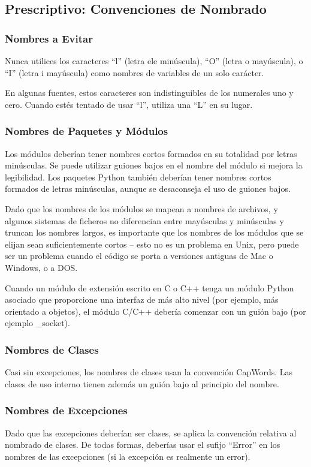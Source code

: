 \documentclass[a4paper,11pt,oneside]{book}
\begin{document}
\subsection{Prescriptivo: Convenciones de Nombrado}
\subsubsection{Nombres a Evitar}
Nunca utilices los caracteres ``l'' (letra ele minúscula), ``O'' (letra o mayúscula), o ``I'' (letra i mayúscula) como nombres de variables de un solo carácter.

En algunas fuentes, estos caracteres son indistinguibles de los numerales uno y cero. Cuando estés tentado de usar ``l'', utiliza una ``L'' en su lugar.
\subsubsection{Nombres de Paquetes y Módulos}
Los módulos deberían tener nombres cortos formados en su totalidad por letras minúsculas. Se puede utilizar guiones bajos en el nombre del módulo si mejora la legibilidad. Los paquetes Python también deberían tener nombres cortos formados de letras minúsculas, aunque se desaconseja el uso de guiones bajos.

Dado que los nombres de los módulos se mapean a nombres de archivos, y algunos sistemas de ficheros no diferencian entre mayúsculas y minúsculas y truncan los nombres largos, es importante que los nombres de los módulos que se elijan sean suficientemente cortos -- esto no es un problema en Unix, pero puede ser un problema cuando el código se porta a versiones antiguas de Mac o Windows, o a DOS.

Cuando un módulo de extensión escrito en C o C++ tenga un módulo Python asociado que proporcione una interfaz de más alto nivel (por ejemplo, más orientado a objetos), el módulo C/C++ debería comenzar con un guión bajo (por ejemplo \_socket).
\subsubsection{Nombres de Clases}
Casi sin excepciones, los nombres de clases usan la convención CapWords. Las clases de uso interno tienen además un guión bajo al principio del nombre.

\subsubsection{Nombres de Excepciones}
Dado que las excepciones deberían ser clases, se aplica la convención relativa al nombrado de clases. De todas formas, deberías usar el sufijo ``Error'' en los nombres de las excepciones (si la excepción es realmente un error).
\end{document}
